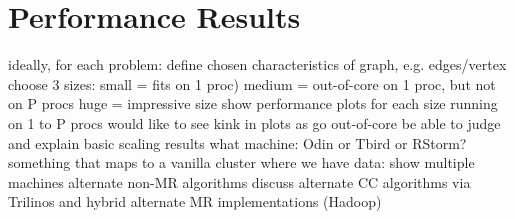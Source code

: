\section{Performance Results}

  ideally, for each problem:
    define chosen characteristics of graph, e.g. edges/vertex
    choose 3 sizes:
      small = fits on 1 proc)
      medium = out-of-core on 1 proc, but not on P procs
      huge = impressive size
  show performance plots for each size running on 1 to P procs
    would like to see kink in plots as go out-of-core
    be able to judge and explain basic scaling results
  what machine: Odin or Tbird or RStorm?
    something that maps to a vanilla cluster
  where we have data:
    show multiple machines
    alternate non-MR algorithms
      discuss alternate CC algorithms via Trilinos and hybrid
    alternate MR implementations (Hadoop)

